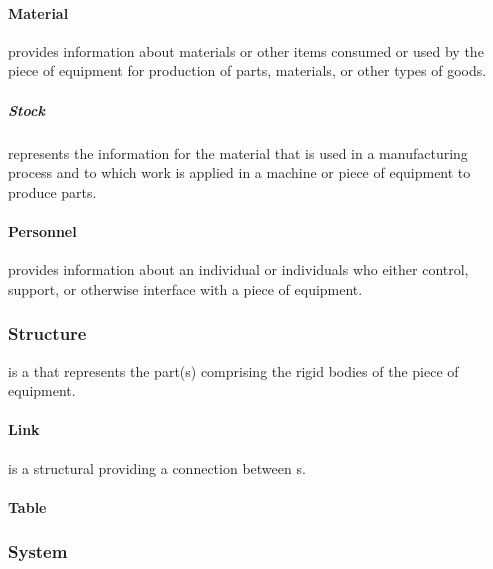 \paragraph{Material}\mbox{}
\label{sec:Material}


 provides information about materials or other items consumed or used by the piece of equipment for production of parts, materials, or other types of goods.


\subparagraph{Stock}\mbox{}
\label{sec:Stock}


 represents the information for the material that is used in a manufacturing process and to which work is applied in a machine or piece of equipment to produce parts.


\paragraph{Personnel}\mbox{}
\label{sec:Personnel}


 provides information about an individual or individuals who either control, support, or otherwise interface with a piece of equipment.



\subsubsection{Structure}
\label{sec:Structure}



 is a  that represents the part(s) comprising the rigid bodies of the piece of equipment.


\paragraph{Link}\mbox{}
\label{sec:Link}


 is a structural  providing a connection between s.


\paragraph{Table}\mbox{}
\label{sec:Table}





\subsubsection{System}
\label{sec:System}



